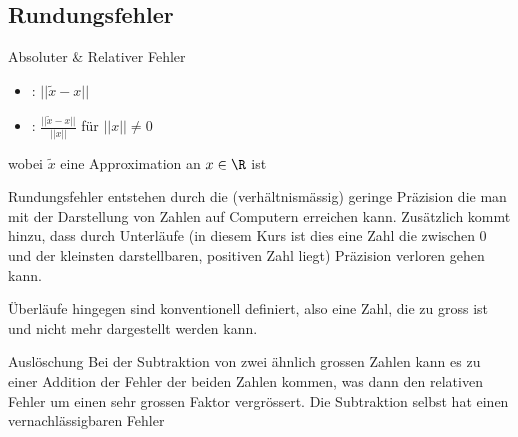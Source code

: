 \subsection{Rundungsfehler}

\begin{definition}[]{Absoluter \& Relativer Fehler}
    \begin{multicols}{2}
        \begin{itemize}
            \item {}: $||\tilde{x} - x||$
            \item {}: $\displaystyle \frac{||\tilde{x} - x||}{||x||}$ für $||x|| \neq 0$
        \end{itemize}
    \end{multicols}
    wobei $\tilde{x}$ eine Approximation an $x \in \R$ ist
\end{definition}

Rundungsfehler entstehen durch die (verhältnismässig) geringe Präzision die man mit der Darstellung von Zahlen auf Computern erreichen kann.
Zusätzlich kommt hinzu, dass durch Unterläufe (in diesem Kurs ist dies eine Zahl die zwischen $0$ und der kleinsten darstellbaren, positiven Zahl liegt) Präzision verloren gehen kann.

Überläufe hingegen sind konventionell definiert, also eine Zahl, die zu gross ist und nicht mehr dargestellt werden kann.


\begin{remark}[]{Auslöschung}
    Bei der Subtraktion von zwei ähnlich grossen Zahlen kann es zu einer Addition der Fehler der beiden Zahlen kommen, was dann den relativen Fehler um einen sehr grossen Faktor vergrössert.
    Die Subtraktion selbst hat einen vernachlässigbaren Fehler
\end{remark}
